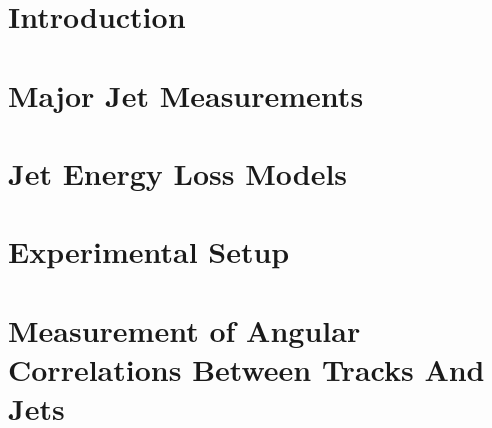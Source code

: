 \documentclass[fullpage, UKenglish]{uiucthesis2009}
\begin{document}
\chapter{Introduction}
\label{sec:theory}

\clearpage

\chapter{Major Jet Measurements}
\label{sec:jetMeasurements}

\clearpage

\chapter{Jet Energy Loss Models}
\label{sec:jetModels}

\clearpage

\chapter{Experimental Setup}
\label{sec:setup}

\clearpage

%
%
\chapter{Measurement of Angular Correlations Between Tracks And Jets}
\label{sec:mainanalysis}

\clearpage

%
\end{document}
